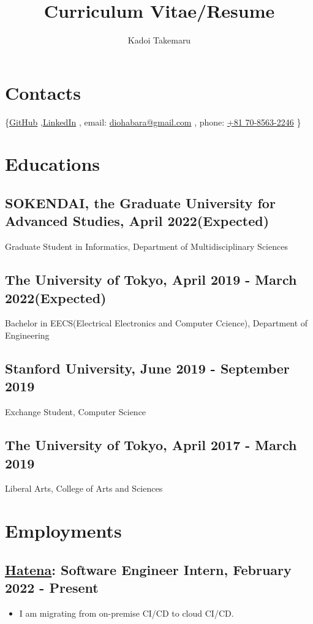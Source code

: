 \documentclass[12pt]{article}
\title{\vspace{-1cm}Curriculum Vitae/Resume}
\author{Kadoi Takemaru}
\date{}
\begin{document}

\section*{Contacts}
  \{\href{https://github.com/diohabara/}{GitHub}
    ,\href{https://www.linkedin.com/in/takemaru-kadoi-6950b5172/}{LinkedIn}
    , email: \href{mailto:diohabara@gmail.com}{diohabara@gmail.com}
    , phone: \href{tel:817085632246}{+81 70-8563-2246}
  \}

\section*{Educations}
  \subsection*{SOKENDAI, the Graduate University for Advanced Studies, April 2022(Expected)}
    Graduate Student in Informatics, Department of Multidisciplinary Sciences
  \subsection*{The University of Tokyo, April 2019 - March 2022(Expected)}
    Bachelor in EECS(Electrical Electronics and Computer Ccience), Department of Engineering
  \subsection*{Stanford University, June 2019 - September 2019}
    Exchange Student, Computer Science
  \subsection*{The University of Tokyo, April 2017 - March 2019}
    Liberal Arts, College of Arts and Sciences

\section*{Employments}
  \subsection*{\href{https://hatenacorp.jp/}{Hatena}: Software Engineer Intern, February 2022 - Present}
    \begin{itemize}
      \item I am migrating from on-premise CI/CD to cloud CI/CD.
    \end{itemize}
\end{document}
